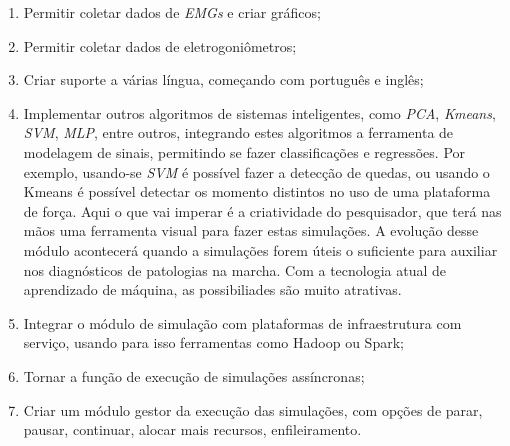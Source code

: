 \begin{enumerate}
	\item Permitir coletar dados de \emph{EMGs} e criar gráficos;
	\item Permitir coletar dados de eletrogoniômetros;
	\item Criar suporte a várias língua, começando com português e inglês;
	\item Implementar outros algoritmos de sistemas inteligentes, como \emph{PCA}, \emph{Kmeans}, \emph{SVM}, \emph{MLP}, entre outros, integrando estes algoritmos a ferramenta de modelagem de sinais, permitindo se fazer classificações e regressões. Por exemplo, usando-se \emph{SVM} é possível fazer a detecção de quedas, ou usando o Kmeans é possível detectar os momento distintos no uso de uma plataforma de força. Aqui o que vai imperar é a criatividade do pesquisador, que terá nas mãos uma ferramenta visual para fazer estas simulações. A evolução desse módulo acontecerá quando a simulações forem úteis o suficiente para auxiliar nos diagnósticos de patologias na marcha. Com a tecnologia atual de aprendizado de máquina, as possibiliades são muito atrativas.
	\item Integrar o módulo de simulação com plataformas de infraestrutura com serviço, usando para isso ferramentas como Hadoop ou Spark;
	\item Tornar a função de execução de simulações assíncronas;
	\item Criar um módulo gestor da execução das simulações, com opções de parar, pausar, continuar, alocar mais recursos, enfileiramento.
\end{enumerate}

